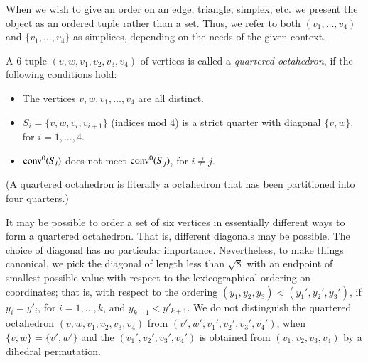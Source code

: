 When we wish to give an order on an edge, triangle, simplex, etc.
we present the object as an ordered tuple rather than a set. Thus,
we refer to both $(v_1,\ldots,v_4)$ and $\{v_1,\ldots,v_4\}$ as
simplices, depending on the needs of the given context.



\begin{definition}  A $6$-tuple $(v,w,v_1,v_2,v_3,v_4)$ of vertices is
called a {\it quartered  octahedron}, if the
following conditions hold:
    \begin{itemize}
    \item The vertices $v,w,v_1,\ldots,v_4$ are all distinct.
    \item $S_i = \{v,w,v_i,v_{i+1}\}$ (indices mod $4$) is a
    strict quarter with diagonal $\{v,w\}$, for $i=1,\ldots,4$.
    \item ${\operatorname{conv}}^0(S_i)$ does not meet ${\operatorname{conv}}^0(S_j)$, for $i\ne j$.
    \end{itemize}
(A quartered octahedron is literally a octahedron that has been
partitioned into four quarters.)
\end{definition}

\begin{remark}\label{def:oct-order}
It may be possible to order a set of six vertices in essentially
different ways to form a quartered octahedron.  That is, different
diagonals may be possible.    The choice of diagonal has no
particular importance.
%
Nevertheless, to make things canonical, we
pick the diagonal of length less than $\sqrt8$ with an endpoint of
smallest possible value with respect to the lexicographical
ordering on coordinates; that is, with respect to the ordering
$(y_1,y_2,y_3) < (y_1',y_2',y_3')$, if $y_i=y'_i$, for
$i=1,\ldots,k$, and $y_{k+1}<y'_{k+1}$.  
%
We do not distinguish the quartered octahedron
$(v,w,v_1,v_2,v_3,v_4)$ from $(v',w',v_1',v_2',v_3',v_4')$, when
$\{v,w\} = \{v',w'\}$ and the $(v_1',v_2',v_3',v_4')$ is obtained
from $(v_1,v_2,v_3,v_4)$ by a dihedral permutation.
\end{remark}




